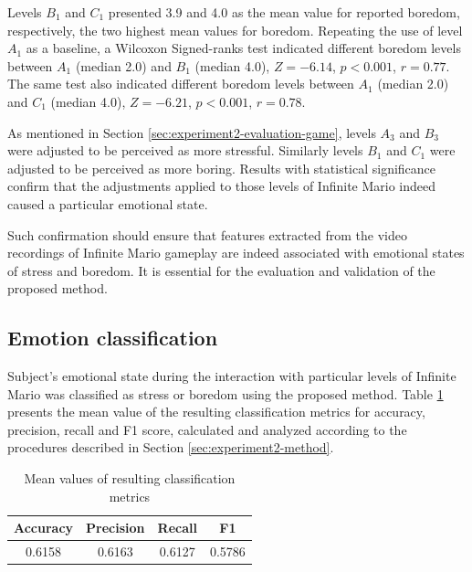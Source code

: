 Levels $B_1$ and $C_1$ presented 3.9 and 4.0 as the mean value for reported boredom, respectively, the two highest mean values for boredom. Repeating the use of level $A_1$ as a baseline, a Wilcoxon Signed-ranks test indicated different boredom levels between $A_1$ (median 2.0) and $B_1$ (median 4.0), $Z=-6.14$, $p < 0.001$, $r=0.77$. The same test also indicated different boredom levels between $A_1$ (median 2.0) and $C_1$ (median 4.0), $Z=-6.21$, $p < 0.001$, $r=0.78$.

As mentioned in Section \ref{sec:experiment2-evaluation-game}, levels $A_3$ and $B_3$ were adjusted to be perceived as more stressful. Similarly levels $B_1$ and $C_1$ were adjusted to be perceived as more boring. Results with statistical significance confirm that the adjustments applied to those levels of Infinite Mario indeed caused a particular emotional state.

Such confirmation should ensure that features extracted from the video recordings of Infinite Mario gameplay are indeed associated with emotional states of stress and boredom. It is essential for the evaluation and validation of the proposed method.

\subsection{Emotion classification}

Subject's emotional state during the interaction with particular levels of Infinite Mario was classified as stress or boredom using the proposed method. Table \ref{table:experiment2-result-metrics-mean} presents the mean value of the resulting classification metrics for accuracy, precision, recall and F1 score, calculated and analyzed according to the procedures described in Section \ref{sec:experiment2-method}.

\begin{table}[ht]
    \centering
    \caption{Mean values of resulting classification metrics}
    \label{table:experiment2-result-metrics-mean}
    \begin{tabular}[l]{@{}cccc}
        \hline
            \textbf{Accuracy} & \textbf{Precision} & \textbf{Recall} & \textbf{F1}\\
        \hline
            0.6158 & 0.6163 & 0.6127 & 0.5786 \\ %
        \hline
    \end{tabular}
\end{table}

